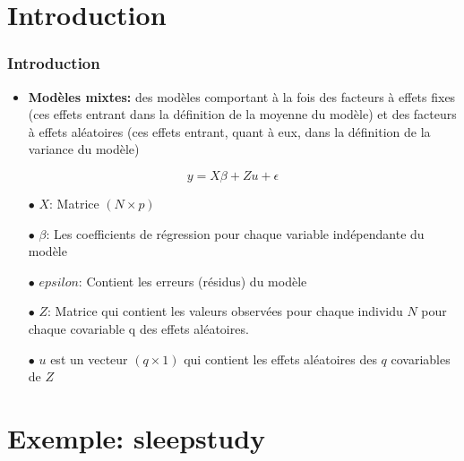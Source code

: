 \documentclass[unknownkeysallowed]{beamer}
\begin{document}
\section{Introduction}
\begin{frame}
\frametitle{Introduction}
\begin{itemize}
    \item \textbf{Modèles mixtes:} des modèles comportant à la fois des facteurs à effets fixes (ces effets entrant dans la définition de la moyenne du modèle) et des facteurs à effets aléatoires (ces effets entrant, quant à eux, dans la définition de la variance du modèle)
\end{itemize}
    $$y=X \beta+Zu+\epsilon$$
    \begin{itemize}
    \item[$\bullet$] $X$: Matrice $(N\times p)$ 
    \item[$\bullet$] $\beta$: Les coefficients de régression pour chaque variable indépendante du modèle
    \item[$\bullet$] $epsilon$: Contient les erreurs (résidus) du modèle
    \item[$\bullet$] $Z$: Matrice qui contient les valeurs observées pour chaque individu $N$ pour chaque covariable q des effets aléatoires.
    \item[$\bullet$] $u$ est un vecteur $(q\times 1)$ qui contient les effets aléatoires des $q$ covariables de $Z$

\end{itemize}
\end{frame}






\section{Exemple: sleepstudy}
\end{document}
